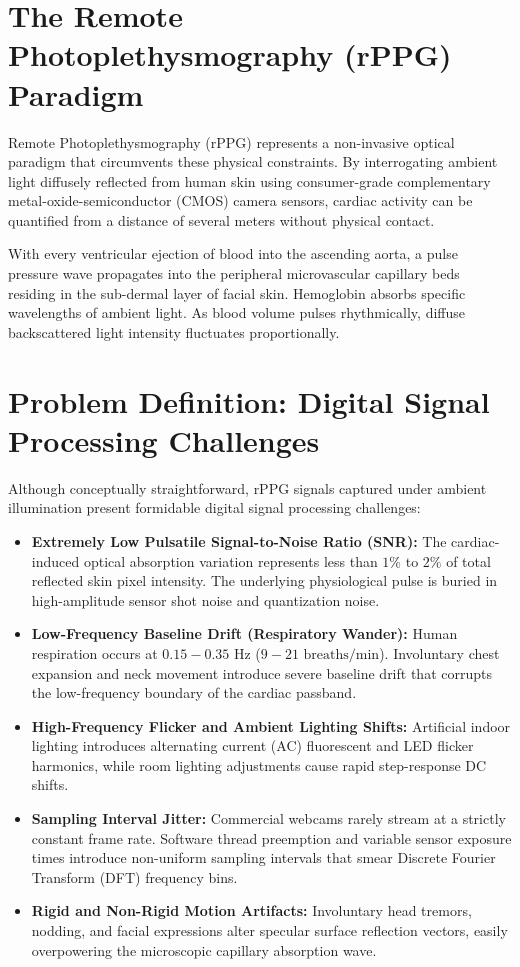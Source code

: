 \documentclass[11pt,a4paper]{report}
\begin{document}
\section{The Remote Photoplethysmography (rPPG) Paradigm}
Remote Photoplethysmography (rPPG) represents a non-invasive optical paradigm that circumvents these physical constraints. By interrogating ambient light diffusely reflected from human skin using consumer-grade complementary metal-oxide-semiconductor (CMOS) camera sensors, cardiac activity can be quantified from a distance of several meters without physical contact.

With every ventricular ejection of blood into the ascending aorta, a pulse pressure wave propagates into the peripheral microvascular capillary beds residing in the sub-dermal layer of facial skin. Hemoglobin absorbs specific wavelengths of ambient light. As blood volume pulses rhythmically, diffuse backscattered light intensity fluctuates proportionally.

\section{Problem Definition: Digital Signal Processing Challenges}
Although conceptually straightforward, rPPG signals captured under ambient illumination present formidable digital signal processing challenges:
\begin{itemize}
    \item \textbf{Extremely Low Pulsatile Signal-to-Noise Ratio (SNR):} The cardiac-induced optical absorption variation represents less than $1\%$ to $2\%$ of total reflected skin pixel intensity. The underlying physiological pulse is buried in high-amplitude sensor shot noise and quantization noise.
    \item \textbf{Low-Frequency Baseline Drift (Respiratory Wander):} Human respiration occurs at $0.15 - 0.35\text{ Hz}$ ($9 - 21\text{ breaths/min}$). Involuntary chest expansion and neck movement introduce severe baseline drift that corrupts the low-frequency boundary of the cardiac passband.
    \item \textbf{High-Frequency Flicker and Ambient Lighting Shifts:} Artificial indoor lighting introduces alternating current (AC) fluorescent and LED flicker harmonics, while room lighting adjustments cause rapid step-response DC shifts.
    \item \textbf{Sampling Interval Jitter:} Commercial webcams rarely stream at a strictly constant frame rate. Software thread preemption and variable sensor exposure times introduce non-uniform sampling intervals that smear Discrete Fourier Transform (DFT) frequency bins.
    \item \textbf{Rigid and Non-Rigid Motion Artifacts:} Involuntary head tremors, nodding, and facial expressions alter specular surface reflection vectors, easily overpowering the microscopic capillary absorption wave.
\end{itemize}
\end{document}
